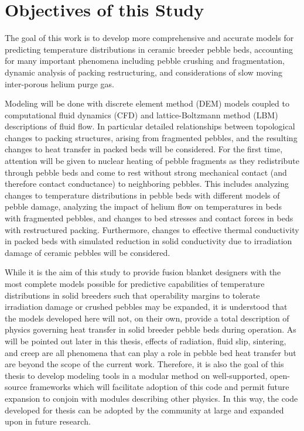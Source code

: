 \section{Objectives of this Study}\label{sec:intro-scope-of-work}
The goal of this work is to develop more comprehensive and accurate models for predicting temperature distributions in ceramic breeder pebble beds, accounting for many important phenomena including pebble crushing and fragmentation, dynamic analysis of packing restructuring, and considerations of slow moving inter-porous helium purge gas. 

Modeling will be done with discrete element method (DEM) models coupled to computational fluid dynamics (CFD) and lattice-Boltzmann method (LBM) descriptions of fluid flow. In particular detailed relationships between topological changes to packing structures, arising from fragmented pebbles, and the resulting changes to heat transfer in packed beds will be considered. For the first time, attention will be given to nuclear heating of pebble fragments as they redistribute through pebble beds and come to rest without strong mechanical contact (and therefore contact conductance) to neighboring pebbles. This includes analyzing changes to temperature distributions in pebble beds with different models of pebble damage, analyzing the impact of helium flow on temperatures in beds with fragmented pebbles, and changes to bed stresses and contact forces in beds with restructured packing. Furthermore, changes to effective thermal conductivity in packed beds with simulated reduction in solid conductivity due to irradiation damage of ceramic pebbles will be considered. 

While it is the aim of this study to provide fusion blanket designers with the most complete models possible for predictive capabilities of temperature distributions in solid breeders such that operability margins to tolerate irradiation damage or crushed pebbles may be expanded, it is understood that the models developed here will not, on their own, provide a total description of physics governing heat transfer in solid breeder pebble beds during operation. As will be pointed out later in this thesis, effects of radiation, fluid slip, sintering, and creep are all phenomena that can play a role in pebble bed heat transfer but are beyond the scope of the current work. Therefore, it is also the goal of this thesis to develop modeling tools in a modular method on well-supported, open-source frameworks which will facilitate adoption of this code and permit future expansion to conjoin with modules describing other physics. In this way, the code developed for thesis can be adopted by the community at large and expanded upon in future research.